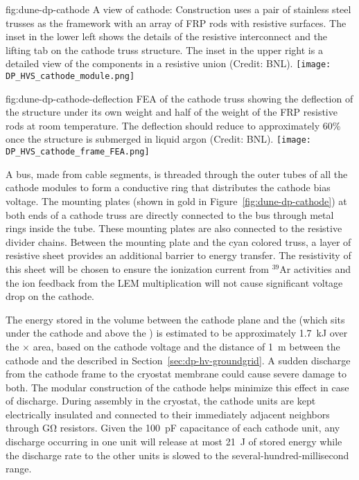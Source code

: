 \begin{dunefigure}{fig:dune-dp-cathode}
{A view of \dual cathode:  Construction uses a pair of stainless steel trusses as the framework with an array of FRP rods with resistive surfaces. The inset in the lower left shows the details of the resistive interconnect and the lifting tab on the cathode truss structure. The inset in the upper right is a detailed view of the components in a resistive union (Credit: BNL).}
\texttt{[image: DP\_HVS\_cathode\_module.png]}
\end{dunefigure}


\begin{dunefigure}{fig:dune-dp-cathode-deflection}
{FEA of the cathode truss showing the deflection of the structure under its own weight and half of the weight of the FRP resistive rods at room temperature.  The deflection should reduce to approximately 60\% once the structure is submerged in liquid argon  (Credit: BNL).}
\texttt{[image: DP\_HVS\_cathode\_frame\_FEA.png]}
\end{dunefigure}


A  bus, made from  cable segments, is threaded through the outer tubes of all the cathode modules to form a conductive ring that distributes the cathode bias voltage.  The mounting plates (shown in gold in Figure~\ref{fig:dune-dp-cathode}) at both ends of a cathode truss are directly connected to the  bus through metal rings inside the tube.  These mounting plates are also connected to the  resistive divider chains. Between the mounting plate and the cyan colored truss, a layer of resistive sheet provides an additional barrier to energy transfer.  The resistivity of this sheet will be chosen to ensure the ionization current from $^{39}$Ar activities and the ion feedback from the LEM multiplication will not cause significant voltage drop on the cathode.


The energy stored in the volume between the cathode plane and the  (which sits under the cathode and above the ) is estimated to be approximately \SI{1.7}{\kilo\joule} over the \dptpcwdth $\times$ \dptpclen area, based on the cathode voltage and the distance of \SI{1}{\m} between the cathode and the  described in Section~\ref{sec:dp-hv-groundgrid}. 
A sudden discharge from the cathode frame to the cryostat membrane could cause severe damage to both.
  The modular construction of the cathode helps minimize this effect in case of discharge. During assembly in the cryostat, the cathode units are kept electrically insulated and connected to their immediately adjacent neighbors through \si{\giga\ohm}  
resistors. Given the \SI{100}{\pico\farad} capacitance of each cathode unit, any discharge occurring in one unit will release at most 
\SI{21}{\joule} of stored energy while the discharge rate  
to the other units is slowed to the several-hundred-millisecond range.

